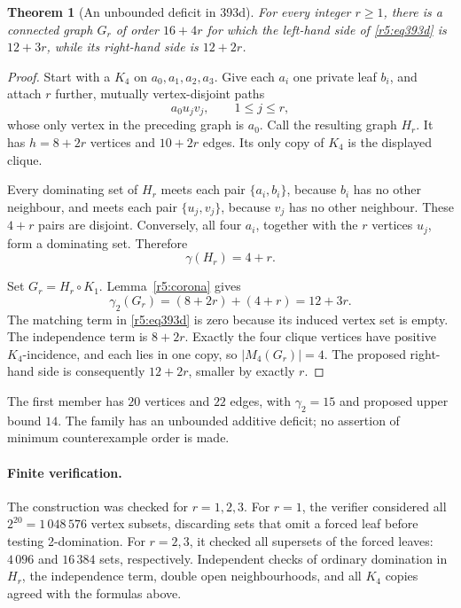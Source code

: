 \documentclass[11pt,a4paper]{article}
\newtheorem{theorem}{Theorem}[section]
\theoremstyle{remark}
\begin{document}
\begin{theorem}[An unbounded deficit in 393d]\label{r5:thm393d}
For every integer \(r\ge1\), there is a connected graph \(G_r\) of
order \(16+4r\) for which the left-hand side of
\eqref{r5:eq393d} is \(12+3r\), while its right-hand side is
\(12+2r\).
\end{theorem}
\begin{proof}
Start with a \(K_4\) on \(a_0,a_1,a_2,a_3\). Give each \(a_i\)
one private leaf \(b_i\), and attach \(r\) further, mutually
vertex-disjoint paths
\[
a_0u_jv_j,\qquad 1\le j\le r,
\]
whose only vertex in the preceding graph is \(a_0\). Call the
resulting graph \(H_r\). It has \(h=8+2r\) vertices and
\(10+2r\) edges. Its only copy of \(K_4\) is the displayed clique.

Every dominating set of \(H_r\) meets each pair \(\{a_i,b_i\}\),
because \(b_i\) has no other neighbour, and meets each pair
\(\{u_j,v_j\}\), because \(v_j\) has no other neighbour. These
\(4+r\) pairs are disjoint. Conversely, all four \(a_i\), together
with the \(r\) vertices \(u_j\), form a dominating set. Therefore
\[
\gamma(H_r)=4+r.
\]

Set \(G_r=H_r\circ K_1\). Lemma~\ref{r5:corona} gives
\[
\gamma_2(G_r)=(8+2r)+(4+r)=12+3r.
\]
The matching term in \eqref{r5:eq393d} is zero because its induced
vertex set is empty. The independence term is \(8+2r\).
Exactly the four clique vertices have positive \(K_4\)-incidence,
and each lies in one copy, so \(|M_4(G_r)|=4\). The proposed
right-hand side is consequently \(12+2r\), smaller by exactly \(r\).
\end{proof}

The first member has \(20\) vertices and \(22\) edges, with
\(\gamma_2=15\) and proposed upper bound \(14\). The family has
an unbounded additive deficit; no assertion of minimum counterexample
order is made.

\paragraph{Finite verification.}
The construction was checked for \(r=1,2,3\). For \(r=1\), the
verifier considered all \(2^{20}=1\,048\,576\) vertex subsets,
discarding sets that omit a forced leaf before testing 2-domination.
For \(r=2,3\), it checked all supersets of the forced leaves:
\(4\,096\) and \(16\,384\) sets, respectively. Independent checks
of ordinary domination in \(H_r\), the independence term,
double open neighbourhoods, and all \(K_4\) copies agreed with the
formulas above.
\end{document}
